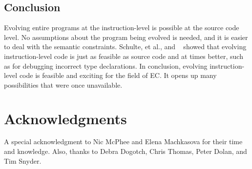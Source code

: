 \documentclass{sig-alternate}
\begin{document}
\subsection{Conclusion}
Evolving entire programs at the instruction-level is possible at the source code level. No assumptions about the program being evolved is needed, and it is easier to deal with the semantic constraints. Schulte, et al., and ~\cite{Assembly:2010, FINCH:2011} showed that evolving instruction-level code is just as feasible as source code and at times better, such as for debugging incorrect type declarations. In conclusion, evolving instruction-level code is feasible and exciting for the field of EC. It opens up many possibilities that were once unavailable.

\section*{Acknowledgments}
A special acknowledgment to Nic McPhee and Elena Machkasova for their time and knowledge. Also, thanks to Debra Dogotch, Chris Thomas, Peter Dolan, and Tim Snyder.

%

%
%
\end{document}
